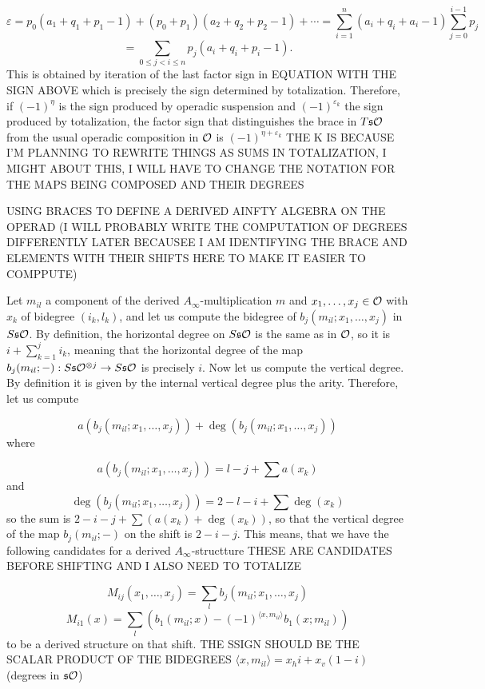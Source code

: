 \documentclass[twoside]{article}
\begin{document}

\[\varepsilon
=p_0(a_1+q_1+p_1-1)+(p_0+p_1)(a_2+q_2+p_2-1)+\cdots=\sum_{i=1}^n(a_i+q_i+a_i-1)\sum_{j=0}^{i-1}p_j\]\[=\sum_{0\leq j<i\leq n}p_j(a_i+q_i+p_i-1).\]
This is obtained by iteration of the last factor sign in EQUATION WITH THE SIGN ABOVE which is precisely the sign determined by totalization. Therefore, if $(-1)^\eta$ is the sign produced by operadic suspension and $(-1)^{\varepsilon_k}$ the sign produced by totalization, the factor sign that distinguishes the brace in $T\mathfrak{s}{\mathcal O}$ from the usual operadic composition in ${\mathcal O}$ is $(-1)^{\eta+\varepsilon_k}$ THE K IS BECAUSE I'M PLANNING TO REWRITE THINGS AS SUMS IN TOTALIZATION, I MIGHT ABOUT THIS, I WILL HAVE TO CHANGE THE NOTATION FOR THE MAPS BEING COMPOSED AND THEIR DEGREES

 USING BRACES TO DEFINE A DERIVED AINFTY ALGEBRA ON THE OPERAD (I WILL PROBABLY  WRITE THE COMPUTATION OF DEGREES DIFFERENTLY LATER BECAUSEE I AM IDENTIFYING THE BRACE AND ELEMENTS WITH THEIR SHIFTS HERE TO MAKE IT EASIER TO COMPPUTE)

Let $m_{il}$ a component of the derived $A_\infty$-multiplication $m$ and $x_1,\dots, x_j\in{\mathcal O}$ with $x_k$ of bidegree $(i_k,l_k)$, and let us compute the bidegree of $b_j(m_{il};x_1,\dots, x_j)$ in $S\mathfrak{s}{\mathcal O}$. By definition, the horizontal degree on $S\mathfrak{s}{\mathcal O}$ is the same as in ${\mathcal O}$, so it is $i+\sum_{k=1}^ji_k$, meaning that the horizontal degree of the map $b_j(m_{il};-):S\mathfrak{s}{\mathcal O}^{\otimes j}\to S\mathfrak{s}{\mathcal O}$ is precisely $i$. Now let us compute the vertical degree. By definition it is given by the internal vertical degree plus the arity. Therefore, let us compute

\[
a(b_j(m_{il};x_1,\dots, x_j))+\deg(b_j(m_{il};x_1,\dots, x_j))
\]
where

\[
a(b_j(m_{il};x_1,\dots, x_j))=l-j+\sum a(x_k)
\]
and 
\[\deg(b_j(m_{il};x_1,\dots, x_j))=2-l-i+\sum \deg(x_k)\]
so the sum is $2-i-j+\sum (a(x_k)+\deg(x_k))$, so that the vertical degree of the map $b_j(m_{il};-)$ on the shift is $2-i-j$. This means, that we have the following candidates for a derived $A_\infty$-structture
THESE ARE CANDIDATES BEFORE SHIFTING  AND I ALSO NEED TO TOTALIZE

\[M_{ij}(x_1,\dots, x_j)=\sum_l b_j(m_{il};x_1,\dots, x_j)\]
\[M_{i1}(x)= \sum_l (b_1(m_{il};x)-(-1)^{\langle x,m_{il}\rangle}b_1(x;m_{il}))\]
to be a derived structure on that shift. THE SSIGN SHOULD BE THE SCALAR PRODUCT OF THE BIDEGREES $\langle x,m_{il}\rangle=x_hi+x_v(1-i)$ (degrees in $\mathfrak{s}{\mathcal O}$)
\end{document}
